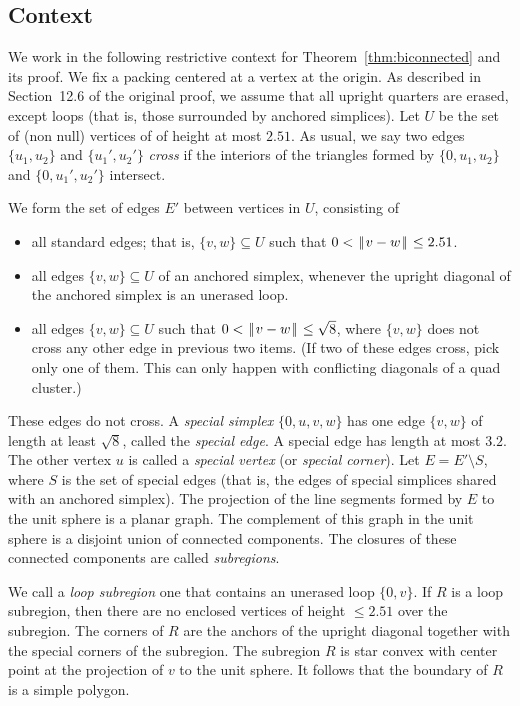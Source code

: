 \documentclass[11pt]{amsart}
\def\|{{\hskip0.1em|\hskip-0.15em|\hskip0.1em}}
\let\subset=\subseteq
\begin{document}
\subsection{Context}

We work in the following restrictive
context for Theorem~\ref{thm:biconnected} and its proof.  
We fix a packing centered at a vertex at the origin.
As described in Section~12.6 of the original proof, we assume that all upright quarters
are erased, except loops (that is, those surrounded by anchored simplices).    
Let $U$ be the set of (non null) vertices of of height at most $2.51$.  As usual, we say two edges $\{u_1,u_2\}$ and $\{u_1',u_2'\}$ {\it cross}
if the interiors of the triangles formed by $\{0,u_1,u_2\}$ and $\{0,u_1',u_2'\}$ intersect.

We form the set of edges $E'$ between vertices in $U$, consisting of
\begin{itemize}
\item all standard edges; that is, $\{v,w\}\subset U$ such that $0<\|v-w\|\le 2.51$.
\item all edges $\{v,w\}\subset U$ of an anchored simplex, whenever the upright diagonal of the anchored simplex is an unerased loop.
\item all edges $\{v,w\}\subset U$ such that $0<\|v-w\|\le\sqrt8$, where $\{v,w\}$ does not cross any other edge in previous two items.  (If two of these edges cross, pick only one of them. This can only happen with conflicting diagonals
of a quad cluster.)
\end{itemize}
These edges do not cross.  A {\it special simplex} $\{0,u,v,w\}$ has one edge $\{v,w\}$ of length at least $\sqrt8$,
called the {\it special edge}.  
A special edge has length at most $3.2$.
The other vertex $u$ is called a {\it special vertex} (or {\it special corner}).
Let $E=E'\setminus S$, where $S$ is the set of special edges (that
is, the edges of special simplices shared with an anchored simplex).
 The projection of the line segments formed by $E$ to the
unit sphere is a planar graph.
The complement of this graph in the unit sphere
is a disjoint union of connected components.  The closures of these connected components are called {\it subregions}.

We call a {\it loop subregion} one that contains an unerased loop $\{0,v\}$.
If $R$ is a loop subregion, then there are no enclosed vertices of height $\le 2.51$ over the
subregion.  The corners of $R$ are the anchors of the upright diagonal together with the special corners
of the subregion.  The subregion $R$ is star convex with center point at the projection of $v$ to the unit sphere.
It follows that the boundary of $R$ is a simple polygon.
\end{document}
